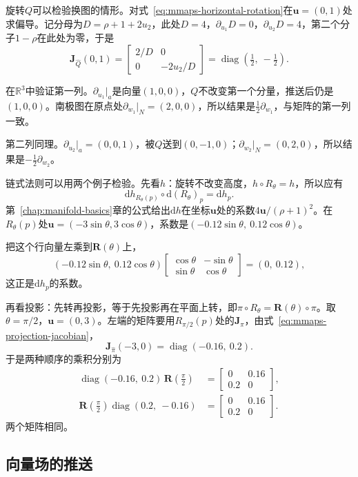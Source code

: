 旋转$Q$可以检验换图的情形。对式~\eqref{eq:mmaps-horizontal-rotation}在$\bm u=(0,1)$处求偏导。记分母为$D=\rho+1+2u_2$，此处$D=4$，$\partial_{u_1}D=0$，$\partial_{u_2}D=4$，第二个分子$1-\rho$在此处为零，于是
\[
\bm J_{\hat Q}(0,1)=\begin{bmatrix}2/D&0\\0&-2u_2/D\end{bmatrix}
=\operatorname{diag}(\tfrac12,\ -\tfrac12).
\]

在$\mathbb R^3$中验证第一列。$\partial_{u_1}|_a$是向量$(1,0,0)$，$Q$不改变第一个分量，推送后仍是$(1,0,0)$。南极图在原点处$\partial_{w_1}|_N=(2,0,0)$，所以结果是$\tfrac12\partial_{w_1}$，与矩阵的第一列一致。

第二列同理。$\partial_{u_2}|_a=(0,0,1)$，被$Q$送到$(0,-1,0)$；$\partial_{w_2}|_N=(0,2,0)$，所以结果是$-\tfrac12\partial_{w_2}$。

链式法则可以用两个例子检验。先看$h$：旋转不改变高度，$h\circ R_\theta=h$，所以应有
\[
\mathrm dh_{R_\theta(p)}\circ\mathrm d(R_\theta)_p=\mathrm dh_p .
\]
第~\ref{chap:manifold-basics}章的公式给出$\mathrm dh$在坐标$\bm u$处的系数$4\bm u/(\rho+1)^2$。在$R_\theta(p)$处$\bm u=(-3\sin\theta,3\cos\theta)$，系数是$(-0.12\sin\theta,\ 0.12\cos\theta)$。

把这个行向量左乘到$\bm R(\theta)$上，
\[
(-0.12\sin\theta,\ 0.12\cos\theta)
\begin{bmatrix}\cos\theta&-\sin\theta\\\sin\theta&\cos\theta\end{bmatrix}
=(0,\ 0.12),
\]
这正是$\mathrm dh_p$的系数。

再看投影：先转再投影，等于先投影再在平面上转，即$\pi\circ R_\theta=\bm R(\theta)\circ\pi$。取$\theta=\pi/2$，$\bm u=(0,3)$。左端的矩阵要用$R_{\pi/2}(p)$处的$\bm J_{\hat\pi}$，由式~\eqref{eq:mmaps-projection-jacobian}，
\[
\bm J_{\hat\pi}(-3,0)=\operatorname{diag}(-0.16,\ 0.2).
\]
于是两种顺序的乘积分别为
\[
\begin{aligned}
\operatorname{diag}(-0.16,\ 0.2)\,\bm R(\tfrac\pi2)&=\begin{bmatrix}0&0.16\\0.2&0\end{bmatrix},\\
\bm R(\tfrac\pi2)\operatorname{diag}(0.2,\ -0.16)&=\begin{bmatrix}0&0.16\\0.2&0\end{bmatrix}.
\end{aligned}
\]
两个矩阵相同。

\subsection{向量场的推送}
\label{sec:mmaps-field-pushforward}

